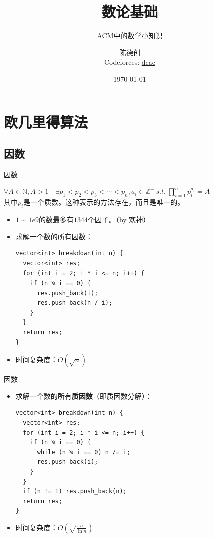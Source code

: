 \documentclass[9pt, c]{beamer}	%
\title{数论基础}
\subtitle{ACM中的数学小知识}
\author[dcac]{陈德创 \\
Codeforces: \textcolor{purple}{\href{https://codeforces.com/profile/dcac}{dcac}}}
\date{\today}
\newcommand{\N}{\mathbb{N}}
\newcommand{\Z}{\mathbb{Z}}
\theoremstyle{plain}
\theoremstyle{definition}
\theoremstyle{remark}
\numberwithin{equation}{section}
\begin{document}
\begin{frame}
\insertlogo
\titlepage
\end{frame}








\section{欧几里得算法}
\subsection{因数}
\begin{frame}[fragile]{因数}
  \pause
  \begin{theorem}[算术基本定理]
    $\forall A\in \N,A>1 \quad \exists p_1<p_2<p_3<\cdots<p_n,a_i\in \Z^+ \  \mathit{s.t.}\  \prod_{i=1}^n p_i^{a_i}=A$\\
    其中$p_i$是一个质数。这种表示的方法存在，而且是唯一的。
  \end{theorem}
  \pause 
  \begin{itemize}
    \item $1\sim 1e9$的数最多有$1344$个因子。（by 欢神）
    \pause
    \item 求解一个数的所有因数：
    \begin{lstlisting}
vector<int> breakdown(int n) {
  vector<int> res;
  for (int i = 2; i * i <= n; i++) {
    if (n % i == 0) {
      res.push_back(i);
      res.push_back(n / i);
    }
  }
  return res;
}
    \end{lstlisting}
    \item 时间复杂度：$O(\sqrt{n})$
  \end{itemize}
\end{frame}

\begin{frame}[fragile]{因数}
  \begin{itemize}
    \item 求解一个数的所有\textbf{质因数}（即质因数分解）：
    \pause
    \begin{lstlisting}
vector<int> breakdown(int n) {
  vector<int> res;
  for (int i = 2; i * i <= n; i++) {
    if (n % i == 0) {
      while (n % i == 0) n /= i;
      res.push_back(i);
    }
  }
  if (n != 1) res.push_back(n);
  return res;
}
    \end{lstlisting}
    \item 时间复杂度：$O(\sqrt{\frac{n}{\ln{n}}})$
  \end{itemize}
\end{frame}
\end{document}
